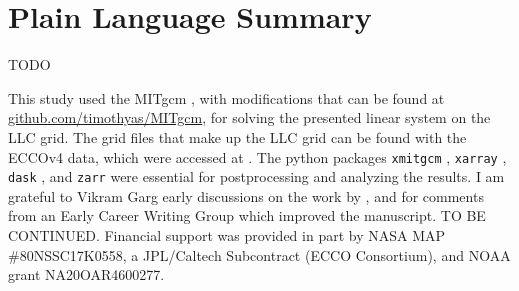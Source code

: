 \documentclass[draft]{Feb-3-22-latex-templates/agujournal2019}
\begin{document}
\section*{Plain Language Summary}
TODO











\appendix




%

\acknowledgments
This study used the MITgcm \citep{campin_mitgcmmitgcm_2021}, with modifications
that can be found at \url{github.com/timothyas/MITgcm}, for solving the
presented linear system on the LLC grid.
The grid files that make up the LLC grid can be found with the ECCOv4 data,
which were accessed at \citep{ecco_v4r2}.
The python packages \texttt{xmitgcm} \citep{abernathey_2021_5139886},
\texttt{xarray} \citep{hoyer2017xarray}, \texttt{dask} \citep{dask}, and
\texttt{zarr} \citep{alistair_miles_2020_3773450}
were essential for postprocessing and analyzing the results.
I am grateful to Vikram Garg early discussions on the
work by \citet{RSSB:RSSB777}, and for comments from an Early Career Writing
Group which improved the manuscript.
TO BE CONTINUED.
Financial support was provided in part by NASA MAP \#80NSSC17K0558, a JPL/Caltech
Subcontract (ECCO Consortium), and NOAA grant NA20OAR4600277.


\end{document}
